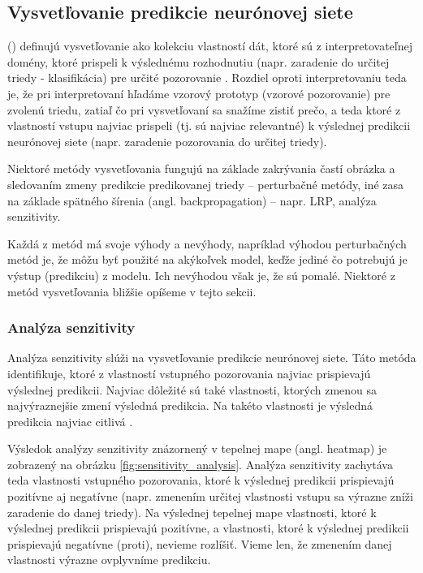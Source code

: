 
\subsection{Vysvetľovanie predikcie neurónovej siete}

\citeauthor{montavon2018methods} (\citeyear{montavon2018methods}) definujú vysvetľovanie ako kolekciu vlastností dát, ktoré sú z interpretovateľnej domény, ktoré prispeli k výslednému rozhodnutiu (napr. zaradenie do určitej triedy - klasifikácia) pre určité pozorovanie \cite{montavon2018methods}. Rozdiel oproti interpretovaniu teda je, že pri interpretovaní hľadáme vzorový prototyp (vzorové pozorovanie) pre zvolenú triedu, zatiaľ čo pri vysvetľovaní sa snažíme zistiť prečo, a teda ktoré z vlastností vstupu najviac prispeli (tj. sú najviac relevantné) k výslednej predikcii neurónovej siete (napr. zaradenie pozorovania do určitej triedy). 

Niektoré metódy vysvetľovania fungujú na základe zakrývania častí obrázka a sledovaním zmeny predikcie predikovanej triedy -- perturbačné metódy, iné zasa na základe spätného šírenia (angl. backpropagation) -- napr. LRP, analýza senzitivity.

Každá z metód má svoje výhody a nevýhody, napríklad výhodou perturbačných metód je, že môžu byť použité na akýkoľvek model, keďže jediné čo potrebujú je výstup (predikciu) z modelu. Ich nevýhodou však je, že sú pomalé. Niektoré z metód vysvetľovania bližšie opíšeme v tejto sekcii.

\subsubsection{Analýza senzitivity}

Analýza senzitivity slúži na vysvetľovanie predikcie neurónovej siete. Táto metóda identifikuje, ktoré z vlastností vstupného pozorovania najviac prispievajú výslednej predikcii. Najviac dôležité sú také vlastnosti, ktorých zmenou sa najvýraznejšie zmení výsledná predikcia. Na takéto vlastnosti je výsledná predikcia najviac citlivá \cite{montavon2018methods}.

Výsledok analýzy senzitivity znázornený v tepelnej mape (angl. heatmap) je zobrazený na obrázku \ref{fig:sensitivity_analysis}. Analýza senzitivity zachytáva teda vlastnosti vstupného pozorovania, ktoré k výslednej predikcii prispievajú pozitívne aj negatívne (napr. zmenením určitej vlastnosti vstupu sa výrazne zníži zaradenie do danej triedy). Na výslednej tepelnej mape vlastnosti, ktoré k výslednej predikcii prispievajú pozitívne, a vlastnosti, ktoré k výslednej predikcii prispievajú negatívne (proti), nevieme rozlíšiť. Vieme len, že zmenením danej vlastnosti výrazne ovplyvníme predikciu.

